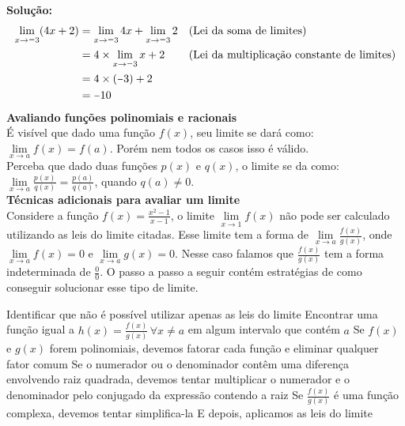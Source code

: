 \documentclass[12pt,a4paper,brazil]{article}
\newcommand{\minus}{\scalebox{0.75}[1.0]{$-$}}
\begin{document}
\textbf{Solução:}
\begin{equation*}
	\begin{aligned}
		\lim\limits_{x \to \minus3} (4x + 2) &= \lim\limits_{x \to \minus3} 4x + \lim\limits_{x \to \minus3} 2 & & \text{(Lei da soma de limites)} \\
											 &= 4 \times \lim\limits_{x \to \minus3} x + 2 & & \text{(Lei da multiplicação constante de limites)} \\
											 &= 4 \times (\minus3) + 2 \\
											 &= \minus10
	\end{aligned}
\end{equation*}
\textbf{Avaliando funções polinomiais e racionais} \\
É visível que dado uma função $f(x)$, seu limite se dará como:
$\lim\limits_{x \to a} f(x) = f(a)$. Porém nem todos os casos isso é válido. \\
Perceba que dado duas funções $p(x)$ e $q(x)$, o limite se da como:
$\lim\limits_{x \to a} \frac{p(x)}{q(x)} = \frac{p(a)}{q(a)}$, quando $q(a) \neq 0$.
\vspace{5mm} \\ %
\textbf{Técnicas adicionais para avaliar um limite} \\
Considere a função $f(x) = \frac{x^2 - 1}{x - 1}$, o limite $\lim\limits_{x \to 1} f(x)$
não pode ser calculado utilizando as leis do limite citadas. Esse limite tem a forma de
$\lim\limits_{x \to a} \frac{f(x)}{g(x)}$, onde $\lim\limits_{x \to a} f(x) = 0$ e $\lim\limits_{x \to a} g(x) = 0$.
Nesse caso falamos que $\frac{f(x)}{g(x)}$ tem a forma indeterminada de $\frac{0}{0}$.
O passo a passo a seguir contém estratégias de como conseguir solucionar esse tipo de limite.
\begin{outline}[enumerate]
	\1 Identificar que não é possível utilizar apenas as leis do limite
	\1 Encontrar uma função igual a $h(x) = \frac{f(x)}{g(x)}\,\forall x \neq a$ em algum intervalo que contém $a$
	\2 Se $f(x)$ e $g(x)$ forem polinomiais, devemos fatorar cada função e eliminar qualquer fator comum
	\2 Se o numerador ou o denominador contêm uma diferença envolvendo raiz quadrada, devemos tentar multiplicar
	o numerador e o denominador pelo conjugado da expressão contendo a raiz
	\2 Se $\frac{f(x)}{g(x)}$ é uma função complexa, devemos tentar simplifica-la
	\1 E depois, aplicamos as leis do limite
\end{outline}
\end{document}
